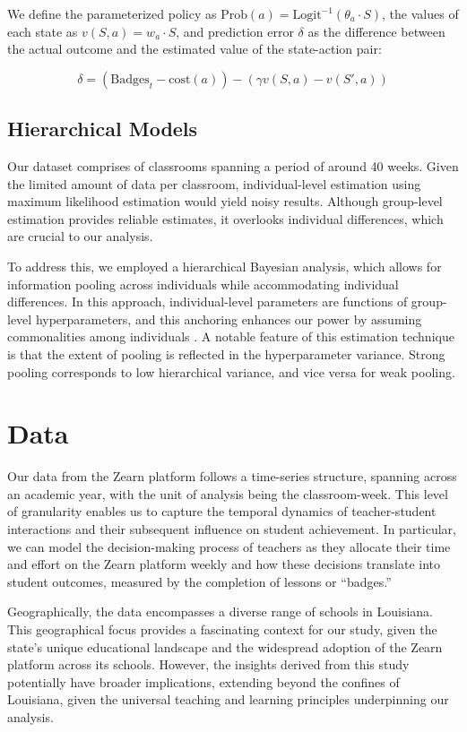 \documentclass[
  number,
  preprint,
  3p,
  onecolumn]{elsarticle}
\begin{document}
We define the parameterized policy as
\(\text{Prob}(a)=\text{Logit}^{-1}(\theta_a \cdot S)\), the values of
each state as \(v(S,a) = w_a \cdot S\), and prediction error \(\delta\)
as the difference between the actual outcome and the estimated value of
the state-action pair:

\[
\delta = (\text{Badges}_{t} - \text{cost}(a)) - \left( \gamma v(S,a) - v(S',a) \right)
\]

\hypertarget{hierarchical-models}{%
\subsection{Hierarchical Models}\label{hierarchical-models}}

Our dataset comprises of classrooms spanning a period of around 40
weeks. Given the limited amount of data per classroom, individual-level
estimation using maximum likelihood estimation would yield noisy
results. Although group-level estimation provides reliable estimates, it
overlooks individual differences, which are crucial to our analysis.

To address this, we employed a hierarchical Bayesian analysis, which
allows for information pooling across individuals while accommodating
individual differences. In this approach, individual-level parameters
are functions of group-level hyperparameters, and this anchoring
enhances our power by assuming commonalities among individuals
\citep{ahn2017}. A notable feature of this estimation technique is that
the extent of pooling is reflected in the hyperparameter variance.
Strong pooling corresponds to low hierarchical variance, and vice versa
for weak pooling.

\hypertarget{data}{%
\section{Data}\label{data}}

Our data from the Zearn platform follows a time-series structure,
spanning across an academic year, with the unit of analysis being the
classroom-week. This level of granularity enables us to capture the
temporal dynamics of teacher-student interactions and their subsequent
influence on student achievement. In particular, we can model the
decision-making process of teachers as they allocate their time and
effort on the Zearn platform weekly and how these decisions translate
into student outcomes, measured by the completion of lessons or
``badges.''

Geographically, the data encompasses a diverse range of schools in
Louisiana. This geographical focus provides a fascinating context for
our study, given the state's unique educational landscape and the
widespread adoption of the Zearn platform across its schools. However,
the insights derived from this study potentially have broader
implications, extending beyond the confines of Louisiana, given the
universal teaching and learning principles underpinning our analysis.
\end{document}
